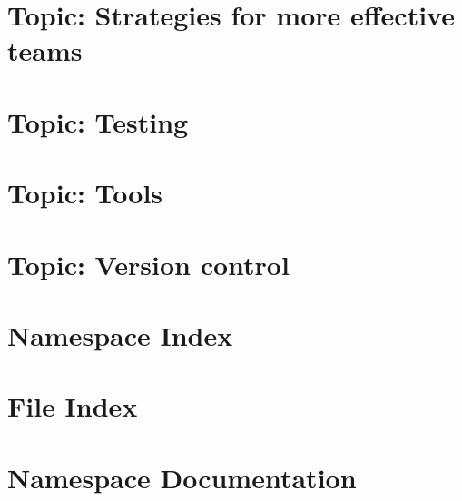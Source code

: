 \documentclass[twoside]{book}
\newcommand{\+}{\discretionary{\mbox{\scriptsize$\hookleftarrow$}}{}{}}
\begin{document}
\chapter{Topic\+: Strategies for more effective teams}
\label{md_markdown_topic_strategies_for_more_effective_teams}

\chapter{Topic\+: Testing}
\label{md_markdown_topic_testing}

\chapter{Topic\+: Tools}
\label{md_markdown_topic_tools}

\chapter{Topic\+: Version control}
\label{md_markdown_topic_version_control}

\chapter{Namespace Index}

\chapter{File Index}

\chapter{Namespace Documentation}

\end{document}
